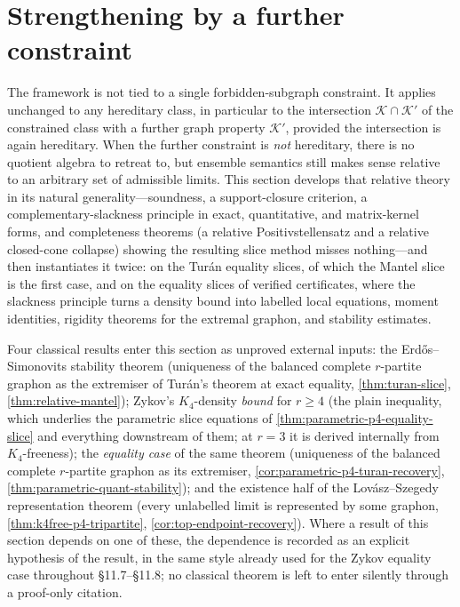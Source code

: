 \documentclass[11pt]{article}
\theoremstyle{definition}
\newcommand{\K}{\mathcal{K}}
\begin{document}
\section{Strengthening by a further constraint}

The framework is not tied to a single forbidden-subgraph constraint.  It applies
unchanged to any hereditary class, in particular to the intersection $\K\cap\K'$ of the
constrained class with a further graph property $\K'$, provided the intersection is again
hereditary.  When the further constraint is \emph{not} hereditary, there is no quotient
algebra to retreat to, but ensemble semantics still makes sense relative to an arbitrary
set of admissible limits.  This section develops that relative theory in its natural
generality---soundness, a support-closure criterion, a complementary-slackness
principle in exact, quantitative, and matrix-kernel forms, and completeness theorems
(a relative Positivstellensatz and a relative closed-cone collapse) showing the
resulting slice method misses nothing---and then instantiates it twice: on the
Tur\'an equality slices, of which the Mantel slice is the first case, and on the equality
slices of verified certificates, where the slackness principle turns a density bound into
labelled local equations, moment identities, rigidity theorems for the extremal graphon,
and stability estimates.

Four classical results enter this section as unproved external inputs: the
Erd\H{o}s--Simonovits stability theorem (uniqueness of the balanced complete $r$-partite
graphon as the extremiser of Tur\'an's theorem at exact equality, \cref{thm:turan-slice},
\cref{thm:relative-mantel}); Zykov's $K_4$-density \emph{bound} for $r\ge4$ (the plain
inequality, which underlies the parametric slice equations of
\cref{thm:parametric-p4-equality-slice} and everything downstream of them; at $r=3$ it is
derived internally from $K_4$-freeness); the \emph{equality case} of the same theorem
(uniqueness of the balanced complete $r$-partite graphon as its extremiser,
\cref{cor:parametric-p4-turan-recovery}, \cref{thm:parametric-quant-stability}); and the
existence half of the Lov\'asz--Szegedy representation theorem (every unlabelled limit is
represented by some graphon, \cref{thm:k4free-p4-tripartite},
\cref{cor:top-endpoint-recovery}).  Where a result of this section depends on one of
these, the dependence is recorded as an explicit hypothesis of the result, in the same
style already used for the Zykov equality case throughout \S11.7--\S11.8; no classical
theorem is left to enter silently through a proof-only citation.
\end{document}
